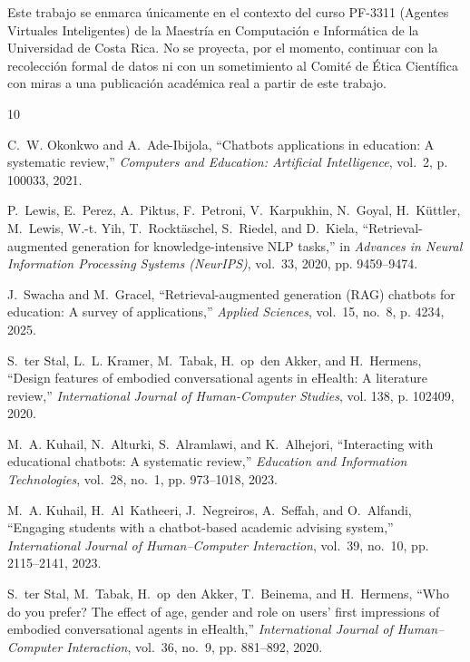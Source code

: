 \documentclass[conference]{IEEEtran}
\begin{document}
Este trabajo se enmarca únicamente en el contexto del curso PF-3311 (Agentes Virtuales Inteligentes) de la Maestría en Computación e Informática de la Universidad de Costa Rica. No se proyecta, por el momento, continuar con la recolección formal de datos ni con un sometimiento al Comité de Ética Científica con miras a una publicación académica real a partir de este trabajo.

\begin{thebibliography}{10}
 
C.~W. Okonkwo and A.~Ade-Ibijola, ``Chatbots applications in education: A
  systematic review,'' \emph{Computers and Education: Artificial Intelligence},
  vol.~2, p. 100033, 2021.
 
P.~Lewis, E.~Perez, A.~Piktus, F.~Petroni, V.~Karpukhin, N.~Goyal,
  H.~K{\"u}ttler, M.~Lewis, W.-t. Yih, T.~Rockt{\"a}schel, S.~Riedel, and
  D.~Kiela, ``Retrieval-augmented generation for knowledge-intensive {NLP}
  tasks,'' in \emph{Advances in Neural Information Processing Systems
  (NeurIPS)}, vol.~33, 2020, pp. 9459--9474.
 
J.~Swacha and M.~Gracel, ``Retrieval-augmented generation ({RAG}) chatbots for
  education: A survey of applications,'' \emph{Applied Sciences}, vol.~15,
  no.~8, p. 4234, 2025.
 
S.~ter Stal, L.~L. Kramer, M.~Tabak, H.~op~den Akker, and H.~Hermens, ``Design
  features of embodied conversational agents in {eHealth}: A literature
  review,'' \emph{International Journal of Human-Computer Studies}, vol. 138,
  p. 102409, 2020.
 
M.~A. Kuhail, N.~Alturki, S.~Alramlawi, and K.~Alhejori, ``Interacting with
  educational chatbots: A systematic review,'' \emph{Education and Information
  Technologies}, vol.~28, no.~1, pp. 973--1018, 2023.
 
M.~A. Kuhail, H.~Al~Katheeri, J.~Negreiros, A.~Seffah, and O.~Alfandi,
  ``Engaging students with a chatbot-based academic advising system,''
  \emph{International Journal of Human--Computer Interaction}, vol.~39, no.~10,
  pp. 2115--2141, 2023.
 
S.~ter Stal, M.~Tabak, H.~op~den Akker, T.~Beinema, and H.~Hermens, ``Who do
  you prefer? {The} effect of age, gender and role on users' first impressions
  of embodied conversational agents in {eHealth},'' \emph{International Journal
  of Human--Computer Interaction}, vol.~36, no.~9, pp. 881--892, 2020.
 

\end{thebibliography}
\end{document}
